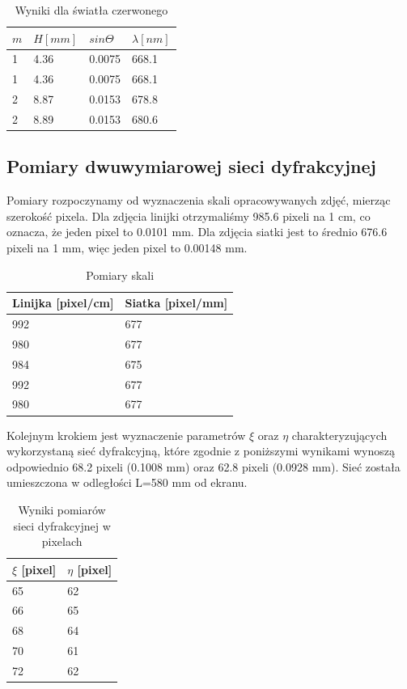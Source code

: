 \documentclass{article}
\begin{document}
\begin{table}[h!]
\centering
\begin{tabular}{|l|l|l|l|}
\hline
$m$ & $H[mm]$ & $sin\Theta$ & $\lambda[nm]$ \\ \hline
1 & 4.36 & 0.0075 & 668.1 \\
1 & 4.36 & 0.0075 & 668.1 \\
2 & 8.87 & 0.0153 & 678.8 \\
2 & 8.89 & 0.0153 & 680.6 \\
\hline
\end{tabular}
\caption{Wyniki dla światła czerwonego}
\end{table}
\clearpage

\subsection{Pomiary dwuwymiarowej sieci dyfrakcyjnej}
Pomiary rozpoczynamy od wyznaczenia skali opracowywanych zdjęć, mierząc szerokość pixela. Dla zdjęcia linijki otrzymaliśmy 985.6 pixeli na 1 cm, co oznacza, że jeden pixel to 0.0101 mm. Dla zdjęcia siatki jest to średnio 676.6 pixeli na 1 mm, więc jeden pixel to 0.00148 mm.
\begin{table}[h!]
\centering
\begin{tabular}{|l|l|}
\hline
Linijka [pixel/cm] & Siatka [pixel/mm] \\ \hline
992 & 677 \\
980 & 677 \\
984 & 675 \\
992 & 677 \\
980 & 677 \\ \hline
\end{tabular}
\caption{Pomiary skali}
\end{table}

Kolejnym krokiem jest wyznaczenie parametrów $\xi$ oraz $\eta$ charakteryzujących wykorzystaną sieć dyfrakcyjną, które zgodnie z poniższymi wynikami wynoszą odpowiednio 68.2 pixeli (0.1008 mm) oraz 62.8 pixeli (0.0928 mm). Sieć została umieszczona w odległości L=580 mm od ekranu.
\begin{table}[h!]
\centering
\begin{tabular}{|l|l|}
\hline
$\xi$ [pixel] & $\eta$ [pixel] \\ \hline
65                   & 62 \\
66                   & 65 \\
68                   & 64 \\
70                   & 61 \\
72                   & 62 \\ \hline
\end{tabular}
\caption{Wyniki pomiarów sieci dyfrakcyjnej w pixelach}
\end{table}
\end{document}
